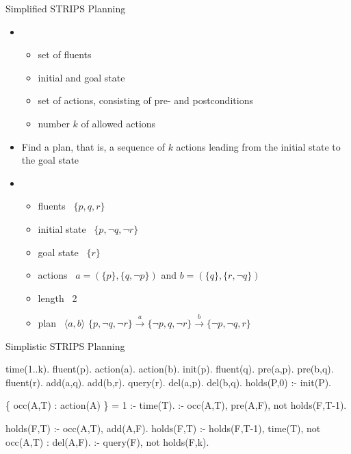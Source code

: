 \begin{frame}{Simplified STRIPS Planning}

  \begin{itemize}
  \item<2-> 
    \begin{itemize}
    \item set of fluents
    \item initial and goal state
    \item set of actions, consisting of pre- and postconditions
    \item number $k$ of allowed actions
    \end{itemize}
  \item<2-> 
    Find a plan, that is, a sequence of $k$ actions leading from the initial state to the goal state
    \smallskip
  \item<3-> 
    \begin{itemize}
    \item fluents       \ $\{p,     q,     r\}$
    \item initial state \ $\{p,\neg q,\neg r\}$
    \item goal state    \ $\{r\}$
    \item actions       \ $a = (\{p\},\{q,\neg p\})$ and $b = (\{q\},\{r,\neg q\})$
    \item length        \ 2
      \medskip
    \item<4-> plan      \ $\langle a, b \rangle$
      \qquad
      \(
      \{     p,\neg q,\neg r\}
      \stackrel{a}{\longrightarrow}
      \{\neg p,     q,\neg r\}
      \stackrel{b}{\longrightarrow}
      \{\neg p,\neg q,     r\}
      \)
    \end{itemize}
    \medskip
  \end{itemize}

\end{frame}
\begin{frame}[fragile,shrink=1]{Simplistic STRIPS Planning}
\begin{semiverbatim}
time(1..k).
\pause
fluent(p).     action(a).     action(b).       init(p).
fluent(q).        pre(a,p).      pre(b,q).
fluent(r).        add(a,q).      add(b,r).     query(r).
                  del(a,p).      del(b,q).
\pause
holds(P,0) :- init(P).

\{ occ(A,T) : action(A) \} = 1 :- time(T).
:- occ(A,T), pre(A,F), not holds(F,T-1).

holds(F,T) :- occ(A,T), add(A,F).
holds(F,T) :- holds(F,T-1), time(T), not occ(A,T) : del(A,F).
\pause
:- query(F), not holds(F,k).
\end{semiverbatim}
\end{frame}
%
